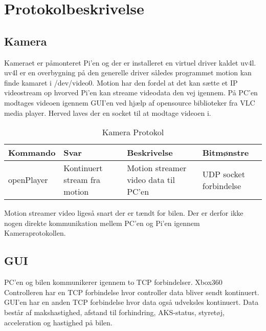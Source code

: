\section{Protokolbeskrivelse}

\subsection{Kamera}

Kameraet er påmonteret Pi'en og der er installeret en virtuel driver kaldet uv4l. uv4l er en overbygning på den generelle driver således programmet motion kan finde kamaret i /dev/video0. Motion har den fordel at det kan sætte et IP videostream op hvorved Pi’en kan streame videodata den vej igennem. På PC'en modtages videoen igennem GUI'en ved hjælp af opensource biblioteker fra VLC media player. Herved laves der en socket til at modtage videoen i.

\begin{table}[h]
\begin{tabularx}{\textwidth}{| Z | Z | Z | Z |} \hline

\textbf{Kommando} 						&
\textbf{Svar}							&
\textbf{Beskrivelse}					&
\textbf{Bitmønstre}						\\ \hline

openPlayer								&
Kontinuert stream fra motion			&
Motion streamer video data til PC'en	&
UDP socket forbindelse					\\ \hline

\end{tabularx}
\caption{Kamera Protokol}
\label{tbl:prt_cam}
\end{table}

Motion streamer video ligeså snart der er tændt for bilen. Der er derfor ikke nogen direkte kommunikation mellem PC'en og Pi'en igennem Kameraprotokollen.


\subsection{GUI}

PC'en og bilen kommunikerer igennem to TCP forbindelser. Xbox360 Controlleren har en TCP forbindelse hvor controller data bliver sendt kontinuert. GUI'en har en anden TCP forbindelse hvor data også udveksles kontinuert. Data består af makshastighed, afstand til forhindring, AKS-status,  styretøj, acceleration og hastighed på bilen. 

